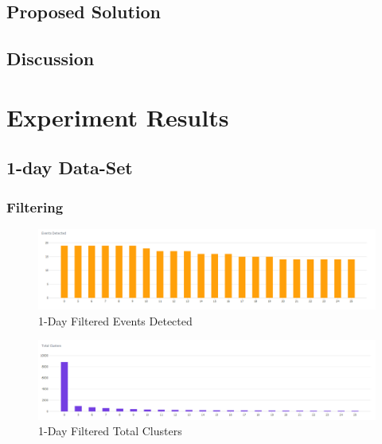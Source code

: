 \documentclass[a4paper,portrait,12pt]{article}
\begin{document}
\subsection{Proposed Solution}
\subsection{Discussion}

\newpage
\nocite{*}


\pagebreak

\appendix

\section{Experiment Results}
\label{appendix:results}

\subsection{1-day Data-Set}
\subsubsection{Filtering}

\begin{figure}[H]
	\centering
	\includegraphics[width=\linewidth]{images/1day-filtered-events-detected.png}
	\caption{1-Day Filtered Events Detected}
	\label{fig:1day-filtered-events-detected}
\end{figure}

\begin{figure}[H]
	\centering
	\includegraphics[width=\linewidth]{images/1day-filtered-total-clusters.png}
	\caption{1-Day Filtered Total Clusters}
	\label{fig:1day-filtered-total-clusters}
\end{figure}
\end{document}
